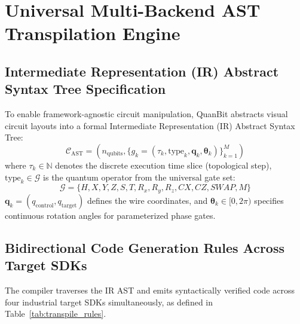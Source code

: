 \documentclass[11pt, a4paper]{article}
\begin{document}
\newpage

\section{Universal Multi-Backend AST Transpilation Engine}

\subsection{Intermediate Representation (IR) Abstract Syntax Tree Specification}
To enable framework-agnostic circuit manipulation, QuanBit abstracts visual circuit layouts into a formal Intermediate Representation (IR) Abstract Syntax Tree:
\begin{equation}
\mathcal{C}_{\text{AST}} = \left( n_{\text{qubits}}, \{ g_k = (\tau_k, \text{type}_k, \mathbf{q}_k, \mathbf{\theta}_k) \}_{k=1}^M \right)
\end{equation}
where $\tau_k \in \mathbb{N}$ denotes the discrete execution time slice (topological step), $\text{type}_k \in \mathcal{G}$ is the quantum operator from the universal gate set:
\begin{equation}
\mathcal{G} = \{ H, X, Y, Z, S, T, R_x, R_y, R_z, CX, CZ, SWAP, M \}
\end{equation}
$\mathbf{q}_k = (q_{\text{control}}, q_{\text{target}})$ defines the wire coordinates, and $\mathbf{\theta}_k \in [0, 2\pi)$ specifies continuous rotation angles for parameterized phase gates.

\subsection{Bidirectional Code Generation Rules Across Target SDKs}
The compiler traverses the IR AST and emits syntactically verified code across four industrial target SDKs simultaneously, as defined in Table~\ref{tab:transpile_rules}.
\end{document}
